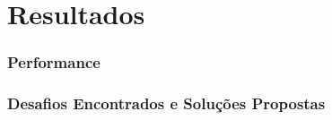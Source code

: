 \section{Resultados}

\subsubsection{Performance}

\subsubsection{Desafios Encontrados e Soluções Propostas}